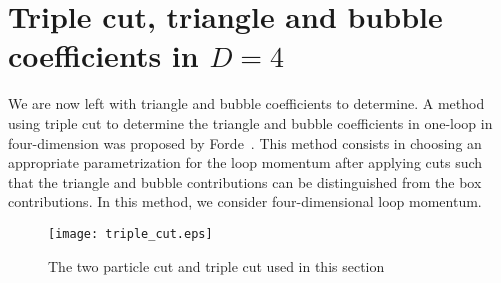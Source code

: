 \section{Triple cut, triangle and bubble coefficients in $D=4$}\label{sect-triple_cut}
We are now left with triangle and bubble coefficients to determine. 
A method using triple cut to determine the triangle and bubble coefficients in one-loop in four-dimension was proposed by Forde~\cite{Forde:2007mi}.
This method consists in choosing an appropriate parametrization for the loop momentum after applying cuts such that the triangle and bubble contributions can be distinguished from the box contributions.
In this method, we consider four-dimensional loop momentum.
\begin{figure}[h]
  \centering
  \texttt{[image: triple\_cut.eps]}
  \caption{The two particle cut and triple cut used in this section}
  \label{fig-triple_cut}
\end{figure}
%
